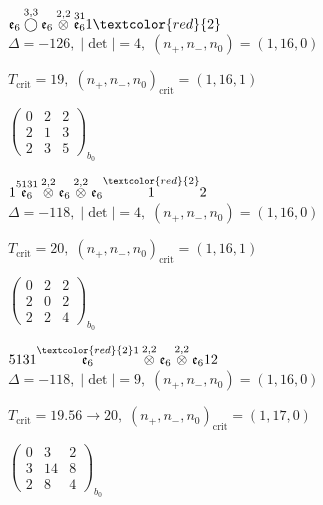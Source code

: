\documentclass[10pt]{article}
\begin{document}
\smallskip

$\mathfrak{e}_6\overset{3,3}{\bigcirc}\mathfrak{e}_6\overset{2,2}{\otimes}\overset{31}{\mathfrak{e}_6}1\textcolor{red}{2}$ \quad $\Delta=-126,\; |\det|=4,\; (n_+,n_-,n_0)=(1,16,0)$

\hspace{1em}$T_{\text{crit}}=19,\; (n_+,n_-,n_0)_{\text{crit}}=(1,16,1)$

\hspace{2em}$\left(\begin{smallmatrix}0 & 2 & 2 \\ 2 & 1 & 3 \\ 2 & 3 & 5\end{smallmatrix}\right)_{\!b_0}$

\smallskip

$1\overset{5131}{\mathfrak{e}_6}\overset{2,2}{\otimes}\mathfrak{e}_6\overset{2,2}{\otimes}\mathfrak{e}_6\overset{\textcolor{red}{2}}{1}2$ \quad $\Delta=-118,\; |\det|=4,\; (n_+,n_-,n_0)=(1,16,0)$

\hspace{1em}$T_{\text{crit}}=20,\; (n_+,n_-,n_0)_{\text{crit}}=(1,16,1)$

\hspace{2em}$\left(\begin{smallmatrix}0 & 2 & 2 \\ 2 & 0 & 2 \\ 2 & 2 & 4\end{smallmatrix}\right)_{\!b_0}$

$5131\overset{\textcolor{red}{2}1}{\mathfrak{e}_6}\overset{2,2}{\otimes}\mathfrak{e}_6\overset{2,2}{\otimes}\mathfrak{e}_612$ \quad $\Delta=-118,\; |\det|=9,\; (n_+,n_-,n_0)=(1,16,0)$

\hspace{1em}$T_{\text{crit}}=19.56 \to 20,\; (n_+,n_-,n_0)_{\text{crit}}=(1,17,0)$

\hspace{2em}$\left(\begin{smallmatrix}0 & 3 & 2 \\ 3 & 14 & 8 \\ 2 & 8 & 4\end{smallmatrix}\right)_{\!b_0}$

\smallskip
\end{document}
